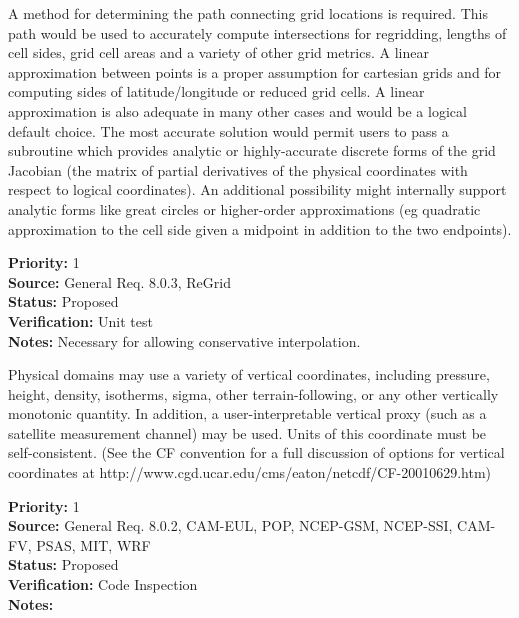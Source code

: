
A method for determining the path connecting grid locations 
is required.  This path would be used to accurately compute
intersections for regridding, lengths of cell sides, grid
cell areas and a variety of other grid metrics.  A linear 
approximation between points is a proper assumption for 
cartesian grids and for computing sides of latitude/longitude
or reduced grid cells.  A linear approximation is also 
adequate in many other cases and would be a logical default choice. 
The most accurate solution would permit users to pass a 
subroutine which provides analytic or highly-accurate discrete 
forms of the grid Jacobian (the matrix of partial derivatives of 
the physical coordinates with respect to logical coordinates).  An 
additional possibility might internally support analytic forms like 
great circles or higher-order approximations (eg quadratic
approximation to the cell side given a midpoint in addition
to the two endpoints).

\begin{reqlist}
{\bf Priority:} 1 \\
{\bf Source:} General Req. 8.0.3, ReGrid \\
{\bf Status:} Proposed \\
{\bf Verification:} Unit test\\
{\bf Notes:} Necessary for allowing conservative interpolation.
\end{reqlist}



Physical domains may use a variety of vertical coordinates, including pressure,
height, density, isotherms, sigma, other terrain-following, or any other
vertically monotonic quantity.  In addition, a user-interpretable vertical
proxy (such as a satellite measurement channel) may be used.  Units of this
coordinate must be self-consistent.  (See the CF convention for a full
discussion of options for vertical coordinates at
http://www.cgd.ucar.edu/cms/eaton/netcdf/CF-20010629.htm)
\begin{reqlist}
{\bf Priority:} 1 \\
{\bf Source:} General Req. 8.0.2, CAM-EUL, POP, NCEP-GSM, NCEP-SSI,
              CAM-FV, PSAS, MIT, WRF \\
{\bf Status:} Proposed \\
{\bf Verification:} Code Inspection\\
{\bf Notes:} 
\end{reqlist}

